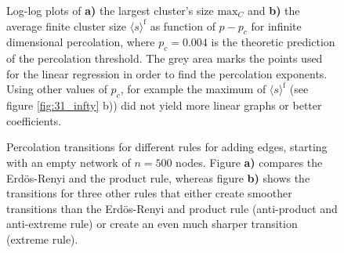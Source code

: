 \documentclass{scrartcl}
\begin{document}
\begin{figure}
    \caption{Log-log plots of \textbf{a)} the largest cluster's size
        $\mathrm{max}_C$ and \textbf{b)} the average finite cluster size
        $\langle s\rangle^\mathrm{f}$ as function of $p-p_c$ for infinite dimensional
        percolation, where $p_c=0.004$ is the theoretic prediction of the
        percolation threshold. The grey area marks the points used for the linear
        regression in order to find the percolation exponents. Using other
        values of $p_c$, for example the maximum of $\langle
        s\rangle^\mathrm{f}$ (see figure \ref{fig:31_infty} b)) did not yield
        more linear graphs or better coefficients.}
    \label{fig:32_infty}
\end{figure}

\begin{figure}
    \caption{Percolation transitions for different rules for adding edges,
        starting with an empty network of $n=500$ nodes. Figure \textbf{a)}
        compares the Erdös-Renyi and the product rule, whereas figure
        \textbf{b)} shows the transitions for three other rules that either create
        smoother transitions than the Erdös-Renyi and product rule
        (anti-product and anti-extreme rule) or create an even much sharper
        transition (extreme rule). }
    \label{fig:33_perc}
\end{figure}
\end{document}
